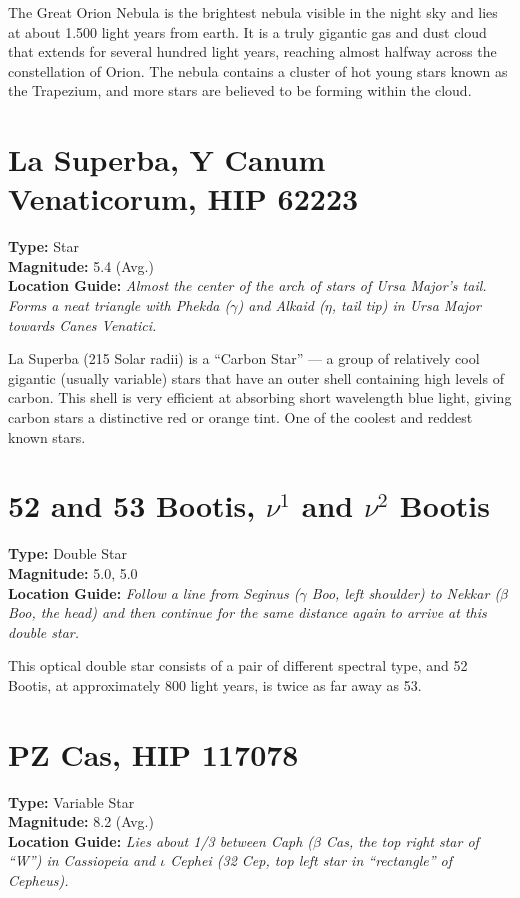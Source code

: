 The Great Orion Nebula is the brightest nebula visible in the night
sky and lies at about 1.500 light years from earth. It is a truly
gigantic gas and dust cloud that extends for several hundred light
years, reaching almost halfway across the constellation of Orion. The
nebula contains a cluster of hot young stars known as the Trapezium,
and more stars are believed to be forming within the cloud.

\section{La Superba, Y Canum Venaticorum, HIP 62223}
\textbf{Type:} Star \\
\textbf{Magnitude:} 5.4 (Avg.) \\
\textbf{Location Guide:} \textit{Almost the center of the arch of stars of Ursa Major's tail. Forms a neat triangle with Phekda ($\gamma$) and Alkaid ($\eta$, tail tip) in Ursa Major towards Canes Venatici.} 

La Superba (215 Solar radii) is a ``Carbon Star'' --- a group of relatively cool gigantic (usually variable) stars that have an outer shell containing high levels of carbon. This shell is very efficient at absorbing short wavelength blue light, giving carbon stars a distinctive red or orange tint. One of the coolest and reddest known stars.

\section{52 and 53 Bootis, \texorpdfstring{$\nu^1$ and $\nu^2$}{nu1 and nu2} Bootis} 
\textbf{Type:} Double Star \\
\textbf{Magnitude:} 5.0, 5.0 \\
\textbf{Location Guide:} \textit{Follow a line from Seginus ($\gamma$ Boo, left shoulder) to Nekkar ($\beta$ Boo, the head) and then continue for the same distance again to arrive at this double star.} 

This optical double star consists of a pair of different spectral type, and 52 Bootis, at approximately 800 light years, is twice as far away as 53.

\section{PZ Cas, HIP 117078}
\textbf{Type:} Variable Star \\
\textbf{Magnitude:} 8.2 (Avg.) \\
\textbf{Location Guide:} \textit{Lies about 1/3 between Caph ($\beta$
  Cas, the top right star of ``W'') in Cassiopeia and $\iota$ Cephei
  (32 Cep, top left star in ``rectangle'' of Cepheus).}

